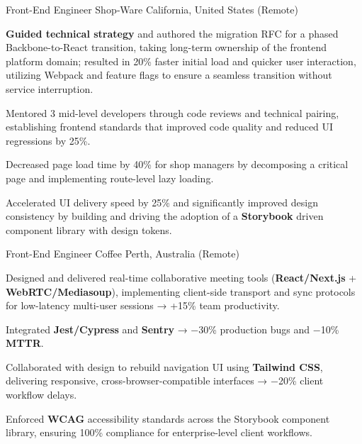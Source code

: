 \begin{cventries}
  \cventry
  {Front-End Engineer} %
  {Shop‑Ware} %
  {California, United States (Remote)} %
  {} %
  {
    \begin{cvitems} %
      \item {\textbf{Guided technical strategy} and authored the migration RFC for a phased Backbone-to-React transition, taking long-term ownership of the frontend platform domain; resulted in 20\% faster initial load and quicker user interaction, utilizing Webpack and feature flags to ensure a seamless transition without service interruption.}
      \item {Mentored 3 mid-level developers through code reviews and technical pairing, establishing frontend standards that improved code quality and reduced UI regressions by 25\%.}
      \item {Decreased page load time by 40\% for shop managers by decomposing a critical page and implementing route-level lazy loading.}
      \item {Accelerated UI delivery speed by 25\% and significantly improved design consistency by building and driving the adoption of a \textbf{Storybook} driven component library with design tokens.}
    \end{cvitems}
  }
  \acvDashedSeparator

  \cventry
  {Front-End Engineer} %
  {Coffee} %
  {Perth, Australia (Remote)} %
  {} %
  {
    \begin{cvitems} %
      \item {Designed and delivered real-time collaborative meeting tools (\textbf{React/Next.js} + \textbf{WebRTC/Mediasoup}), implementing client-side transport and sync protocols for low-latency multi-user sessions → +15\% team productivity.}
      \item {Integrated \textbf{Jest/Cypress} and \textbf{Sentry} → −30\% production bugs and −10\% \textbf{MTTR}.}
      \item {Collaborated with design to rebuild navigation UI using \textbf{Tailwind CSS}, delivering responsive, cross-browser-compatible interfaces → −20\% client workflow delays.}
      \item {Enforced \textbf{WCAG} accessibility standards across the Storybook component library, ensuring 100\% compliance for enterprise-level client workflows.}
    \end{cvitems}
  }
  \acvDashedSeparator


\end{cventries}
